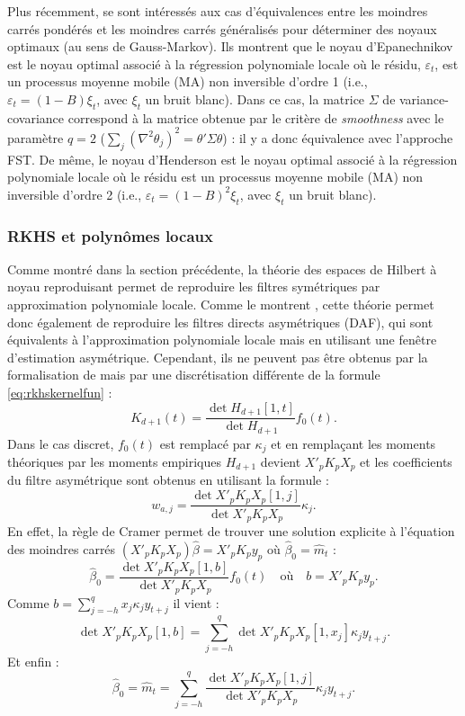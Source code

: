 \documentclass[
  12pt,
  a4paper,french]{article}
\newcommand\1{\mathds{1}}
\begin{document}
Plus récemment, \textcite{LuatiProietti2011} se sont intéressés aux cas d'équivalences entre les moindres carrés pondérés et les moindres carrés généralisés pour déterminer des noyaux optimaux (au sens de Gauss-Markov).
Ils montrent que le noyau d'Epanechnikov est le noyau optimal associé à la régression polynomiale locale où le résidu, \(\varepsilon_t\), est un processus moyenne mobile (MA) non inversible d'ordre 1 (i.e., \(\varepsilon_t=(1-B)\xi_t\), avec \(\xi_t\) un bruit blanc).
Dans ce cas, la matrice \(\Sigma\) de variance-covariance correspond à la matrice obtenue par le critère de \emph{smoothness} avec le paramètre \(q=2\) (\(\sum_{j}(\nabla^{2}\theta_{j})^{2} = \theta'\Sigma\theta\)) : il y a donc équivalence avec l'approche FST.
De même, le noyau d'Henderson est le noyau optimal associé à la régression polynomiale locale où le résidu est un processus moyenne mobile (MA) non inversible d'ordre 2 (i.e., \(\varepsilon_t=(1-B)^2\xi_t\), avec \(\xi_t\) un bruit blanc).

\hypertarget{rkhs-et-polynuxf4mes-locaux}{%
\subsubsection{RKHS et polynômes locaux}\label{rkhs-et-polynuxf4mes-locaux}}

Comme montré dans la section précédente, la théorie des espaces de Hilbert à noyau reproduisant permet de reproduire les filtres symétriques par approximation polynomiale locale.
Comme le montrent \textcite{LuatiProietti2011}, cette théorie permet donc également de reproduire les filtres directs asymétriques (DAF), qui sont équivalents à l'approximation polynomiale locale mais en utilisant une fenêtre d'estimation asymétrique.
Cependant, ils ne peuvent pas être obtenus par la formalisation de \textcite{dagumbianconcini2008} mais par une discrétisation différente de la formule \eqref{eq:rkhskernelfun} :
\[
K_{d+1}(t)=\frac{\det{H_{d+1}[1,t]}}{\det{H_{d+1}}}f_0(t).
\]
Dans le cas discret, \(f_0(t)\) est remplacé par \(\kappa_j\) et en remplaçant les moments théoriques par les moments empiriques \(H_{d+1}\) devient \(X'_pK_pX_p\) et les coefficients du filtre asymétrique sont obtenus en utilisant la formule :
\[
w_{a,j}=\frac{\det{X'_pK_pX_p[1,j]}
}{
\det{X'_pK_pX_p}
}\kappa_j.
\]
En effet, la règle de Cramer permet de trouver une solution explicite à l'équation des moindres carrés \((X'_pK_pX_p)\hat \beta=X'_pK_py_p\) où \(\hat \beta_0=\hat m_t\) :
\[
\hat \beta_0 = \frac{\det{X'_pK_pX_p[1,b]}}{\det{X'_pK_pX_p}}f_0(t)
\quad\text{où}\quad b=X'_pK_py_p.
\]
Comme \(b=\sum_{j=-h}^qx_j\kappa_jy_{t+j}\) il vient :
\[
\det{X'_pK_pX_p[1,b]} = \sum_{j=-h}^q\det{X'_pK_pX_p[1,x_j]}\kappa_jy_{t+j}.
\]
Et enfin :
\[
\hat \beta_0 = \hat m_t= \sum_{j=-h}^q\frac{\det{X'_pK_pX_p[1,j]}
}{
\det{X'_pK_pX_p}
}\kappa_j y_{t+j}.
\]
\end{document}

